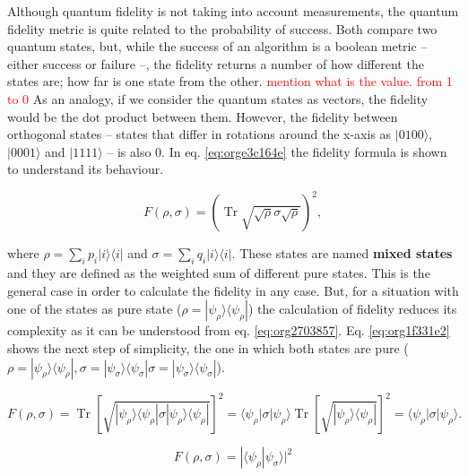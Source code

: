 Although quantum fidelity is not taking into account measurements, the quantum fidelity metric is quite related to the probability of success.
Both compare two quantum states, but, while the success of an algorithm is a boolean metric -- either success or failure --, the fidelity returns a number of how different the states are; how far is one state from the other. \textcolor{red}{mention what is the value. from 1 to 0}
As an analogy, if we consider the quantum states as vectors, the fidelity would be the dot product between them.
However, the fidelity between orthogonal states -- states that differ in rotations around the x-axis as \(| 0100 \rangle\), \(| 0001 \rangle\) and \(| 1111 \rangle\) -- is also 0.
In eq. \ref{eq:orge3c164e} the fidelity formula is shown to understand its behaviour.

\begin{equation}
\label{eq:orge3c164e}
{\displaystyle F(\rho ,\sigma )=\left(\operatorname {Tr} {\sqrt {{\sqrt {\rho }}\sigma {\sqrt {\rho }}}}\right)^{2},}
\end{equation}

where \(\rho =\sum _{i}p_{i}|i\rangle \langle i|\) and \(\sigma =\sum _{i}q_{i}|i\rangle \langle i|\).
These states are named \textbf{mixed states} and they are defined as the weighted sum of different pure states.
This is the general case in order to calculate the fidelity in any case.
But, for a situation with one of the states as pure state (\({\displaystyle \rho =|\psi _{\rho }\rangle \!\langle \psi _{\rho }|}\)) the calculation of fidelity reduces its complexity as it can be understood from eq. \ref{eq:org2703857}.
Eq. \ref{eq:org1f331e2} shows the next step of simplicity, the one in which both states are pure (\({\displaystyle \rho =|\psi _{\rho }\rangle \!\langle \psi _{\rho }|}, {\displaystyle \sigma =|\psi _{\sigma }\rangle \!\langle \psi _{\sigma }|} {\displaystyle \sigma =|\psi _{\sigma }\rangle \!\langle \psi _{\sigma }|}\)).


\begin{equation}
\label{eq:org2703857}
{\displaystyle F(\rho ,\sigma )=\operatorname {Tr} \left[{\sqrt {|\psi _{\rho }\rangle \langle \psi _{\rho }|\sigma |\psi _{\rho }\rangle \langle \psi _{\rho }|}}\right]^{2}=\langle \psi _{\rho }|\sigma |\psi _{\rho }\rangle \operatorname {Tr} \left[{\sqrt {|\psi _{\rho }\rangle \langle \psi _{\rho }|}}\right]^{2}=\langle \psi _{\rho }|\sigma |\psi _{\rho }\rangle .}
\end{equation}

\begin{equation}
\label{eq:org1f331e2}
{\displaystyle F(\rho ,\sigma )=|\langle \psi _{\rho }|\psi _{\sigma }\rangle |^{2}}
\end{equation}


